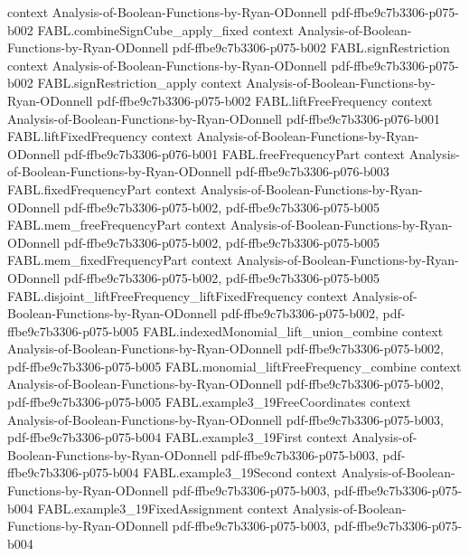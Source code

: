 \begin{theorem}
  {context}
  {Analysis-of-Boolean-Functions-by-Ryan-ODonnell}
  {pdf-ffbe9c7b3306-p075-b002}
\proofstep
  {FABL.combineSignCube_apply_fixed}
  {context}
  {Analysis-of-Boolean-Functions-by-Ryan-ODonnell}
  {pdf-ffbe9c7b3306-p075-b002}
\proofstep
  {FABL.signRestriction}
  {context}
  {Analysis-of-Boolean-Functions-by-Ryan-ODonnell}
  {pdf-ffbe9c7b3306-p075-b002}
\proofstep
  {FABL.signRestriction_apply}
  {context}
  {Analysis-of-Boolean-Functions-by-Ryan-ODonnell}
  {pdf-ffbe9c7b3306-p075-b002}
\proofstep
  {FABL.liftFreeFrequency}
  {context}
  {Analysis-of-Boolean-Functions-by-Ryan-ODonnell}
  {pdf-ffbe9c7b3306-p076-b001}
\proofstep
  {FABL.liftFixedFrequency}
  {context}
  {Analysis-of-Boolean-Functions-by-Ryan-ODonnell}
  {pdf-ffbe9c7b3306-p076-b001}
\proofstep
  {FABL.freeFrequencyPart}
  {context}
  {Analysis-of-Boolean-Functions-by-Ryan-ODonnell}
  {pdf-ffbe9c7b3306-p076-b003}
\proofstep
  {FABL.fixedFrequencyPart}
  {context}
  {Analysis-of-Boolean-Functions-by-Ryan-ODonnell}
  {pdf-ffbe9c7b3306-p075-b002,
    pdf-ffbe9c7b3306-p075-b005}
\proofstep
  {FABL.mem_freeFrequencyPart}
  {context}
  {Analysis-of-Boolean-Functions-by-Ryan-ODonnell}
  {pdf-ffbe9c7b3306-p075-b002,
    pdf-ffbe9c7b3306-p075-b005}
\proofstep
  {FABL.mem_fixedFrequencyPart}
  {context}
  {Analysis-of-Boolean-Functions-by-Ryan-ODonnell}
  {pdf-ffbe9c7b3306-p075-b002,
    pdf-ffbe9c7b3306-p075-b005}
\proofstep
  {FABL.disjoint_liftFreeFrequency_liftFixedFrequency}
  {context}
  {Analysis-of-Boolean-Functions-by-Ryan-ODonnell}
  {pdf-ffbe9c7b3306-p075-b002,
    pdf-ffbe9c7b3306-p075-b005}
\proofstep
  {FABL.indexedMonomial_lift_union_combine}
  {context}
  {Analysis-of-Boolean-Functions-by-Ryan-ODonnell}
  {pdf-ffbe9c7b3306-p075-b002,
    pdf-ffbe9c7b3306-p075-b005}
\proofstep
  {FABL.monomial_liftFreeFrequency_combine}
  {context}
  {Analysis-of-Boolean-Functions-by-Ryan-ODonnell}
  {pdf-ffbe9c7b3306-p075-b002,
    pdf-ffbe9c7b3306-p075-b005}
\proofstep
  {FABL.example3_19FreeCoordinates}
  {context}
  {Analysis-of-Boolean-Functions-by-Ryan-ODonnell}
  {pdf-ffbe9c7b3306-p075-b003,
    pdf-ffbe9c7b3306-p075-b004}
\proofstep
  {FABL.example3_19First}
  {context}
  {Analysis-of-Boolean-Functions-by-Ryan-ODonnell}
  {pdf-ffbe9c7b3306-p075-b003,
    pdf-ffbe9c7b3306-p075-b004}
\proofstep
  {FABL.example3_19Second}
  {context}
  {Analysis-of-Boolean-Functions-by-Ryan-ODonnell}
  {pdf-ffbe9c7b3306-p075-b003,
    pdf-ffbe9c7b3306-p075-b004}
\proofstep
  {FABL.example3_19FixedAssignment}
  {context}
  {Analysis-of-Boolean-Functions-by-Ryan-ODonnell}
  {pdf-ffbe9c7b3306-p075-b003,
    pdf-ffbe9c7b3306-p075-b004}

\end{theorem}
